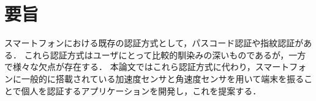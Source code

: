 \chapter*{要旨}
スマートフォンにおける既存の認証方式として，パスコード認証や指紋認証がある．
これら認証方式はユーザにとって比較的馴染みの深いものであるが，一方で様々な欠点が存在する．
本論文ではこれら認証方式に代わり，スマートフォンに一般的に搭載されている加速度センサと角速度センサを用いて端末を振ることで個人を認証するアプリケーションを開発し，これを提案する．

